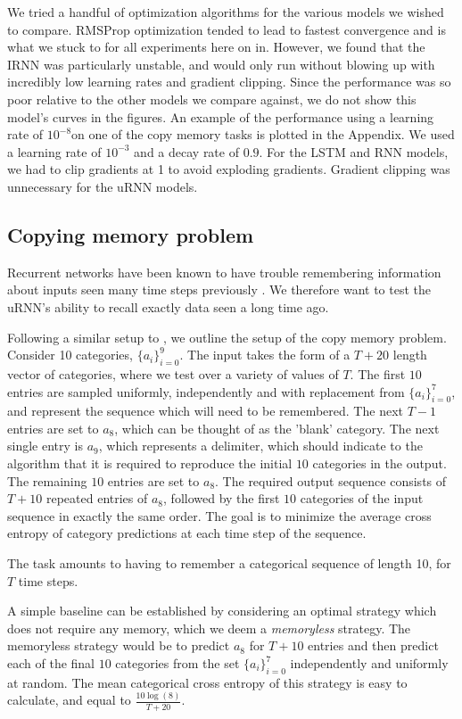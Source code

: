 \documentclass{article} %
\begin{document}
We tried a handful of optimization algorithms for the various models we wished to compare. 
RMSProp optimization \citep{RMSPROP} tended to lead to fastest convergence and is what we stuck to for all
experiments here on in. However, we found that the IRNN was particularly unstable, and would only run without 
blowing up with incredibly low learning rates and gradient clipping. Since the performance was so poor
relative to the other models we compare against, we do not show this model's curves in the figures. An example of the
performance using a learning rate of $10^{-8} $on one of the copy memory tasks is plotted in the Appendix. 
We used a learning rate of $10^{-3}$
and a decay rate of $0.9$. For the LSTM and RNN models, we had to clip gradients at 1 to avoid exploding 
gradients. Gradient clipping was unnecessary for the uRNN models.


\subsection{Copying memory problem}

Recurrent networks have been known to have trouble remembering information about inputs seen
many time steps previously \citep{Yoshua94, Pascanu2013}. 
We therefore want to test the uRNN's ability to recall exactly data seen a long time ago.

Following a similar setup to \cite{LSTM}, we outline the setup of the copy memory problem.
Consider 10 categories, $\{ a_i \}_{i=0}^9$.   
The input takes the form of a $T+20$ length vector of categories, where we test over a variety of values
of $T$. 
The first $10$ entries are sampled uniformly, independently and with replacement from $\{a_i\}_{i=0}^7$,
and represent the sequence which will need to be remembered. 
The next $T-1$ entries are set to $a_8$, which can be thought of as the 'blank' category. 
The next single entry is $a_9$, which represents a delimiter, which should indicate to the algorithm
that it is required to reproduce the initial $10$ categories in the output. 
The remaining $10$ entries are set to $a_8$. The required output sequence consists of $T+10$ 
repeated entries of $a_8$, followed by the first $10$ categories of the input sequence in exactly the
same order. The goal is to minimize the average cross entropy of category predictions 
at each time step of the sequence.
 
The task amounts to having to remember a categorical sequence of length 10, for $T$ time steps.

A simple baseline can be established by considering an optimal strategy which does not require any memory, 
which we deem a \textit{memoryless} strategy. The memoryless strategy would be to predict $a_8$ for 
$T+10$ entries and then predict each of the final $10$ categories from the set $\{a_i\}_{i=0}^7$ independently
and uniformly at random. The mean categorical cross entropy of this strategy is easy to calculate, and equal 
to $\frac{10 \log(8) }{T+20} $. 
\end{document}
